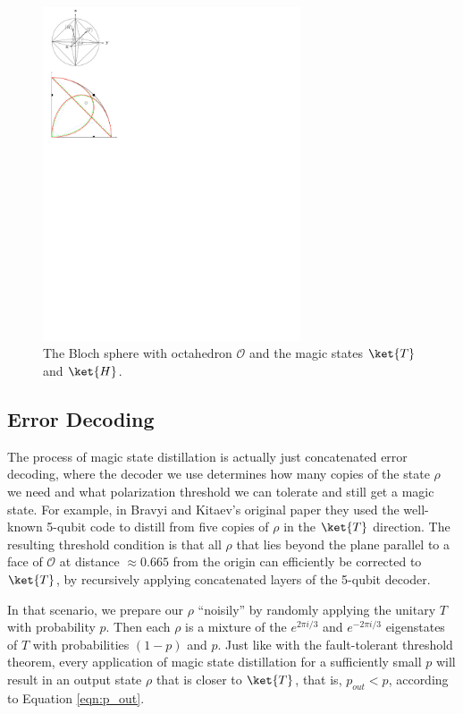 \begin{figure}
\includegraphics[width=3in]{figures/blochsphere.pdf}
\caption{The Bloch sphere with octahedron $\mathcal{O}$ and the magic states
$\ket{T}$ and $\ket{H}$.}
\label{fig:clifford-octahedron}
\end{figure}

\subsection{Error Decoding}

The process of magic state distillation is actually just
concatenated error decoding, where the decoder we use determines how many
copies of the state $\rho$ we need and what polarization threshold we can
tolerate and still get a magic state. For example, in Bravyi and 
Kitaev's original paper \cite{Bravyi2004} they used the well-known 5-qubit
code to distill from five copies of $\rho$ in the $\ket{T}$ direction.
The resulting threshold condition is that all $\rho$ that lies beyond the plane
parallel to a face of $\mathcal{O}$ at distance $\approx 0.665$ from the
origin can efficiently be corrected to $\ket{T}$, by recursively applying
concatenated layers of the 5-qubit decoder.

In that scenario, we prepare our $\rho$ ``noisily'' by
randomly applying the unitary $T$ with probability $p$.
Then each $\rho$ is a mixture of the $e^{2\pi i / 3}$ and
$e^{-2\pi i / 3}$ eigenstates of $T$ with probabilities $(1-p)$ and $p$.
Just like with the fault-tolerant
threshold theorem, every application of magic state distillation for a
sufficiently small $p$ will result in an output state $\rho$ that is closer
to $\ket{T}$, that is, $p_{out} < p$, according to Equation
\ref{eqn:p_out}.

